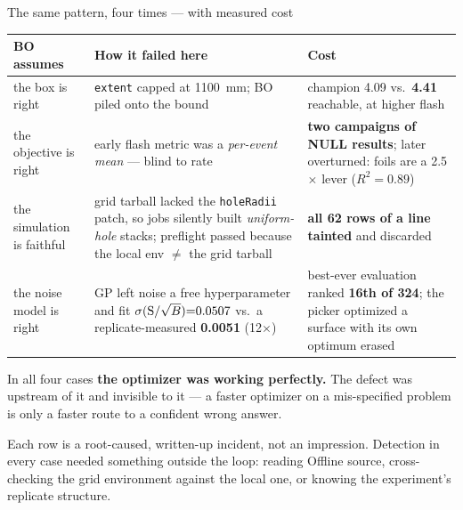 \documentclass[aspectratio=169,10pt]{beamer}
\begin{document}
\begin{frame}{The same pattern, four times --- with measured cost}
\scriptsize
\begin{tabular}{@{}W{2.45cm}W{5.0cm}W{4.5cm}@{}}
\toprule
\textbf{BO assumes} & \textbf{How it failed here} & \textbf{Cost} \\
\midrule
the box is right &
\texttt{extent} capped at 1100~mm; BO piled onto the bound &
champion 4.09 vs.\ \textbf{4.41} reachable, at higher flash \\[0.35em]

the objective is right &
early flash metric was a \emph{per-event mean} --- blind to rate &
\textbf{two campaigns of NULL results}; later overturned: foils are a 2.5$\times$
lever ($R^2{=}0.89$) \\[0.35em]

the simulation is faithful &
grid tarball lacked the \texttt{holeRadii} patch, so jobs silently built
\emph{uniform-hole} stacks; preflight passed because the local env $\neq$ the grid
tarball &
\textbf{all 62 rows of a line tainted} and discarded \\[0.35em]

the noise model is right &
GP left noise a free hyperparameter and fit $\sigma({\rm S}/\sqrt{B}){=}0.0507$ vs.\
a replicate-measured \textbf{0.0051} (12$\times$) &
best-ever evaluation ranked \textbf{16th of 324}; the picker optimized a surface with
its own optimum erased \\
\bottomrule
\end{tabular}
\vspace{0.8em}

\normalsize
In all four cases \textbf{the optimizer was working perfectly.} The defect was
upstream of it and invisible to it --- a faster optimizer on a mis-specified problem
is only a faster route to a confident wrong answer.
\vspace{0.4em}

\footnotesize
Each row is a root-caused, written-up incident, not an impression. Detection in every
case needed something outside the loop: reading Offline source, cross-checking the
grid environment against the local one, or knowing the experiment's replicate
structure.
\end{frame}
\end{document}

